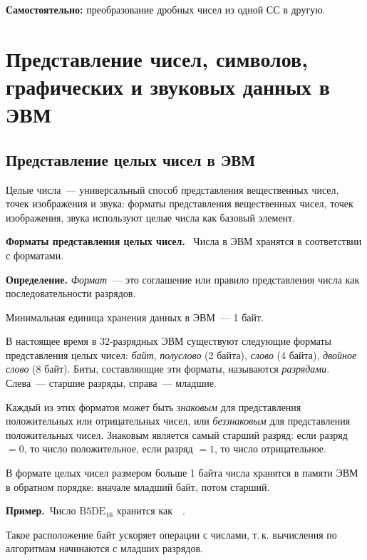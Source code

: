 \documentclass[a4paper,11pt]{article}
\newcommand{\lead}[1]{\textbf{\color{leadcol}#1}\ }
\newcommand{\prim}{\textbf{Пример.}\ }
\begin{document}
\begin{hwbox}
\textbf{Самостоятельно:} преобразование дробных чисел из одной СС в другую.
\end{hwbox}

\section{Представление чисел, символов, графических и звуковых данных в ЭВМ}

\subsection{Представление целых чисел в ЭВМ}

Целые числа~--- универсальный способ представления вещественных чисел, точек изображения и звука:
форматы представления вещественных чисел, точек изображения, звука используют целые числа как
базовый элемент.

\lead{Форматы представления целых чисел.} Числа в ЭВМ хранятся в соответствии с форматами.

\begin{opr}
\textbf{Определение.} \emph{Формат}~--- это соглашение или правило представления числа как
последовательности разрядов.
\end{opr}

Минимальная единица хранения данных в ЭВМ~--- 1 байт.

В настоящее время в 32-разрядных ЭВМ существуют следующие форматы представления целых чисел:
\emph{байт}, \emph{полуслово} (2 байта), \emph{слово} (4 байта), \emph{двойное слово} (8 байт).
Биты, составляющие эти форматы, называются \emph{разрядами}. Слева~--- старшие разряды,
справа~--- младшие.

Каждый из этих форматов может быть \emph{знаковым} для представления положительных или
отрицательных чисел, или \emph{беззнаковым} для представления положительных чисел.
Знаковым является самый старший разряд: если разряд $= 0$, то число положительное, если
разряд $= 1$, то число отрицательное.

В формате целых чисел размером больше 1 байта числа хранятся в памяти ЭВМ в обратном порядке:
вначале младший байт, потом старший.

\prim Число $\mathrm{B5DE}_{16}$ хранится как \ \,.

Такое расположение байт ускоряет операции с числами, т.\,к. вычисления по алгоритмам начинаются
с младших разрядов.
\end{document}
